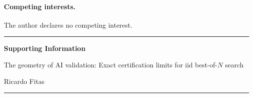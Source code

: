 \documentclass[10pt,twocolumn]{article}
\begin{document}
\paragraph{Competing interests.} The author declares no competing interest.


{\small}

\clearpage
\onecolumn
\noindent\rule{\textwidth}{1.6pt}
\begin{center}
{\LARGE\bfseries Supporting Information\par}
\vspace{0.45em}
{\large The geometry of AI validation: Exact certification limits for iid best-of-$N$ search\par}
\vspace{0.35em}
{\normalsize Ricardo Fitas\par}
\end{center}
\noindent\rule{\textwidth}{0.45pt}
\vspace{0.8em}

\newcommand{\one}{\mathbf 1}
\setcounter{equation}{0}
\setcounter{table}{0}
\setcounter{figure}{0}
\setcounter{theorem}{0}
\setcounter{lemma}{0}
\setcounter{proposition}{0}
\setcounter{corollary}{0}
\renewcommand{\theequation}{S\arabic{equation}}
\renewcommand{\thetable}{S\arabic{table}}
\renewcommand{\thefigure}{S\arabic{figure}}
\renewcommand{\thetheorem}{S\arabic{theorem}}
\renewcommand{\thelemma}{S\arabic{lemma}}
\renewcommand{\theproposition}{S\arabic{proposition}}
\renewcommand{\thecorollary}{S\arabic{corollary}}
\renewcommand{\theHequation}{S\arabic{equation}}
\renewcommand{\theHtable}{S\arabic{table}}
\renewcommand{\theHfigure}{S\arabic{figure}}
\providecommand{\theHtheorem}{}
\providecommand{\theHlemma}{}
\providecommand{\theHproposition}{}
\providecommand{\theHcorollary}{}
\renewcommand{\theHtheorem}{S\arabic{theorem}}
\renewcommand{\theHlemma}{S\arabic{lemma}}
\renewcommand{\theHproposition}{S\arabic{proposition}}
\renewcommand{\theHcorollary}{S\arabic{corollary}}


\end{document}
